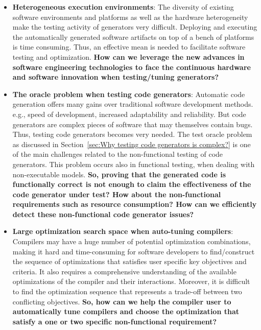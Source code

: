 \begin{itemize}
	\item \textbf{Heterogeneous execution environments}: 
	The diversity of existing software environments and platforms as well as the hardware heterogeneity make the testing activity of generators very difficult. Deploying and executing the automatically generated software artifacts on top of a bench of platforms is time consuming. Thus, an effective mean is needed to facilitate software testing and optimization.
	\textbf{How can we leverage the new advances in software engineering technologies to face the continuous hardware and software innovation when testing/tuning generators?} 
	
    \item \textbf{The oracle problem when testing code generators}: 	
	Automatic code generation offers many gains over traditional software development methods. e.g., speed of development, increased adaptability and reliability. But code generators are complex pieces of software that may themselves contain bugs. Thus, testing code generators becomes very needed. The test oracle problem as discussed in Section~\ref{sec:Why testing code generators is complex?} is one of the main challenges related to the non-functional testing of code generators. This problem occurs also in functional testing, when dealing with non-executable models.
	\textbf{
	So, proving that the generated code is functionally correct is not enough to claim the effectiveness of the code generator under test? How about the non-functional requirements such as resource consumption?
	How can we efficiently detect these non-functional code generator issues?}
	
	\item \textbf{Large optimization search space when auto-tuning compilers}: 
	Compilers may have a huge number of potential optimization combinations, making it hard and time-consuming for software developers to find/construct the sequence of optimizations that satisfies user specific key objectives and criteria. It also requires a comprehensive understanding of the available optimizations of the compiler and their interactions. Moreover, it is difficult to find the optimization sequence that represents a trade-off between two conflicting objectives.  
	\textbf{So, how can we help the compiler user to automatically tune compilers and choose the optimization that satisfy a one or two specific non-functional requirement? }
	

\end{itemize}
